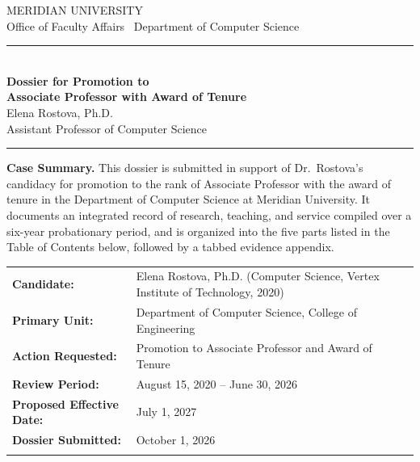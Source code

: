 \thispagestyle{empty}

\begin{center}
  {\sffamily\small\color{slate}\MakeUppercase{Meridian University}}\\[0.1em]
  {\sffamily\footnotesize\color{slate}Office of Faculty Affairs \textbullet\ Department of Computer Science}\\[1.1em]
  {\color{crimson}\rule{0.6\linewidth}{1.2pt}}\\[1.0em]
  {\sffamily\bfseries\fontsize{22}{26}\selectfont\color{inknavy}Dossier for Promotion to\\[0.1em] Associate Professor with Award of Tenure}\\[1.0em]
  {\fontsize{16}{19}\selectfont\color{inknavy}Elena Rostova, Ph.D.}\\[0.2em]
  {\sffamily\small\color{slate}Assistant Professor of Computer Science}\\[1.0em]
  {\color{hairline}\rule{0.6\linewidth}{0.6pt}}
\end{center}

\vspace{1.2em}

\begin{casebox}
\noindent\textbf{\color{inknavy}Case Summary.} This dossier is submitted in support of Dr.\ Rostova's candidacy for promotion to the rank of Associate Professor with the award of tenure in the Department of Computer Science at Meridian University. It documents an integrated record of research, teaching, and service compiled over a six-year probationary period, and is organized into the five parts listed in the Table of Contents below, followed by a tabbed evidence appendix.
\end{casebox}

\vspace{0.6em}

\noindent
\begin{tabularx}{\linewidth}{@{}l X@{}}
\textbf{\sffamily\small\color{slate}Candidate:} & Elena Rostova, Ph.D. (Computer Science, Vertex Institute of Technology, 2020) \\{}
\textbf{\sffamily\small\color{slate}Primary Unit:} & Department of Computer Science, College of Engineering \\{}
\textbf{\sffamily\small\color{slate}Action Requested:} & Promotion to Associate Professor and Award of Tenure \\{}
\textbf{\sffamily\small\color{slate}Review Period:} & August 15, 2020 -- June 30, 2026 \\{}
\textbf{\sffamily\small\color{slate}Proposed Effective Date:} & July 1, 2027 \\{}
\textbf{\sffamily\small\color{slate}Dossier Submitted:} & October 1, 2026 \\{}
\end{tabularx}

